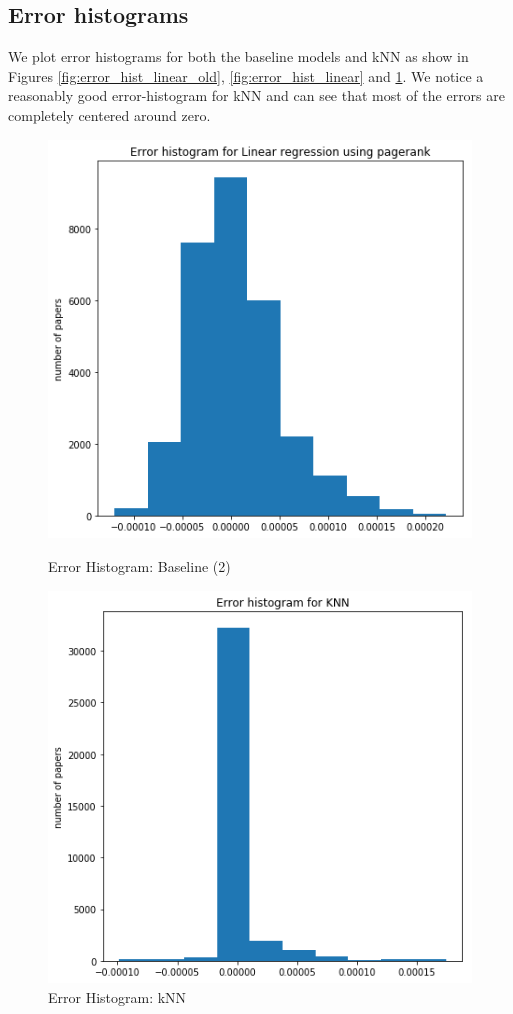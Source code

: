 \documentclass[a4paper, 11pt]{article}
\begin{document}
\subsection{Error histograms}

We plot error histograms for both the baseline models and kNN as show in Figures \ref{fig:error_hist_linear_old}, \ref{fig:error_hist_linear} and \ref{fig:error_hist_knn}. We notice a reasonably good error-histogram for kNN and  can see that most of the errors are completely centered around zero.

\begin{figure}[!htb] 
%
  \includegraphics[width=\linewidth]{error_hist_linear.png}
   \caption{Error Histogram: Baseline (2)}
     \label{fig:error_hist_linear}
\endminipage\hfill
{}%
  \includegraphics[width=\linewidth]{error_hist_knn.png}
   \caption{Error Histogram: kNN}
  \label{fig:error_hist_knn}
\endminipage\hfill
\end{figure}
\end{document}

